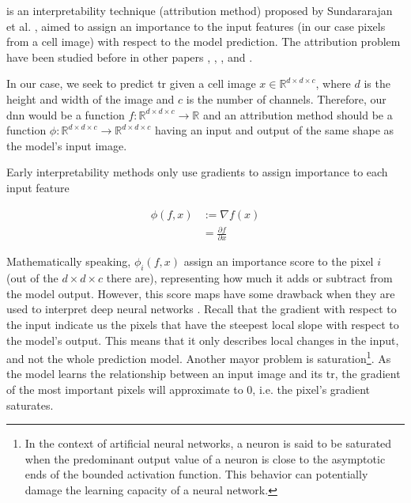 
{} is an interpretability technique (attribution method) proposed by Sundararajan et al. \cite{sundararajan2017axiomatic}, aimed to assign an importance to the input features (in our case pixels from a cell image) with respect to the model prediction. The attribution problem have been studied before in other papers \cite{JMLR:v11:baehrens10a}, \cite{SimonyanVZ13}, \cite{ShrikumarGSK16}, \cite{BinderMBMS16} and \cite{Springenberg}.

In our case, we seek to predict \gls{tr} given a cell image $x \in \mathbb{R}^{d \times d \times c}$, where $d$ is the height and width of the image and $c$ is the number of channels. Therefore, our \gls{dnn} would be a function $f:\mathbb{R}^{d \times d \times c} \rightarrow \mathbb{R}$ and an attribution method should be a function $\phi:\mathbb{R}^{d \times d \times c} \rightarrow \mathbb{R}^{d \times d \times c}$ having an input and output of the same shape as the model's input image.

Early interpretability methods only use gradients to assign importance to each input feature

\begin{equation}
  \begin{split}
    \phi(f,x) &:= \nabla f(x) \\
    &= \frac{\partial f}{\partial x}
  \end{split}
\end{equation}

Mathematically speaking, $\phi_i(f,x)$ assign an importance score to the pixel $i$ (out of the $d \times d \times c$ there are), representing how much it adds or subtract from the model output. However, this score maps have some drawback when they are used to interpret deep neural networks \cite{sturmfels2020visualizing}. Recall that the gradient with respect to the input indicate us the pixels that have the steepest local slope with respect to the model's output. This means that it only describes local changes in the input, and not the whole prediction model. Another mayor problem is saturation\footnote{In the context of artificial neural networks, a neuron is said to be saturated when the predominant output value of a neuron is close to the asymptotic ends of the bounded activation function. This behavior can potentially damage the learning capacity of a neural network.}.
As the model learns the relationship between an input image and its \gls{tr}, the gradient of the most important pixels will approximate to 0, i.e. the pixel's gradient saturates.


